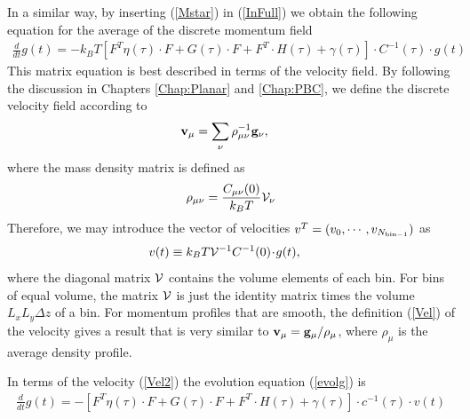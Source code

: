 \documentclass[b5paper,openright,10pt]{book}
\newcommand{\esc}{\!\cdot\!}
\begin{document}
In  a similar  way, by  inserting (\ref{Mstar})  in (\ref{InFull})  we
obtain the following equation for the average of the discrete momentum
field
\begin{align}
   \frac{d}{dt}g(t)= -k_BT \left[{F}^T{\eta}(\tau)\esc{F}
+{G}(\tau)\esc{F}
+F^T\esc{H}(\tau)+{\gamma}(\tau)\right]
\esc C^{-1}(\tau)\esc  g(t) 
\label{evolg}
\end{align}
This matrix equation is best described in terms of the velocity field.
By following  the discussion  in Chapters \ref{Chap:Planar} and \ref{Chap:PBC}, we  define the  discrete
velocity field according to
\begin{align}
  {\bf v}_\mu&=\sum_{\nu}\rho_{\mu\nu}^{-1}{\bf g}_\nu,
\label{Vel}
\end{align}
where the mass density  matrix is defined as
\begin{align}
\rho_{\mu\nu}=\frac{C_{\mu\nu}(0)}{k_BT}  {\cal V}_\nu
\label{rhomunuAp}
\end{align}
Therefore,  we  may  introduce  the  vector  of  velocities
$v^T=(v_0,\cdots,v_{N_{\rm bin -1}})$ as
\begin{align}
v(t)&\equiv  k_BT{\cal V}^{-1}C^{-1}(0) \esc g(t) ,
\label{Vel2}
\end{align}
where the diagonal  matrix ${\cal V}$ contains the  volume elements of
each bin.  For bins of equal volume, the matrix ${\cal V}$ is just the
identity  matrix times  the volume  $L_xL_y\Delta  z$ of  a bin.   For
momentum profiles that  are smooth, the definition  (\ref{Vel}) of the
velocity  gives a  result that  is very  similar to  ${\bf v}_\mu={\bf
  g}_\mu/\rho_\mu$, where $\rho_\mu$ is the average density profile.


In terms of the velocity (\ref{Vel2}) the evolution equation (\ref{evolg}) is
\begin{align}
   \frac{d}{dt}g(t)= -\left[{F}^T{\eta}(\tau)\esc{F}
+{G}(\tau)\esc{F}
+F^T\esc{H}(\tau)+{\gamma}(\tau)\right]
\esc c^{-1}(\tau)\esc v(t)
\label{evolg2}
\end{align}
\end{document}
